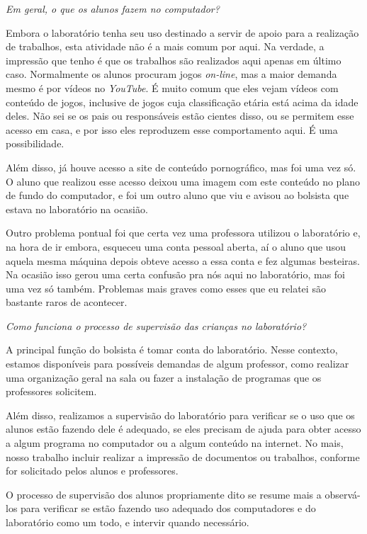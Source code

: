 \textit{Em geral, o que os alunos fazem no computador?}

Embora o laboratório tenha seu uso destinado a servir de apoio para a realização de trabalhos, esta atividade não é a mais comum por aqui. Na verdade, a impressão que tenho é que os trabalhos são realizados aqui apenas em último caso. Normalmente os alunos procuram jogos \textit{on-line}, mas a maior demanda mesmo é por vídeos no \textit{YouTube}. É muito comum que eles vejam vídeos com conteúdo de jogos, inclusive de jogos cuja classificação etária está acima da idade deles. Não sei se os pais ou responsáveis estão cientes disso, ou se permitem esse acesso em casa, e por isso eles reproduzem esse comportamento aqui. É uma possibilidade.

Além disso, já houve acesso a site de conteúdo pornográfico, mas foi uma vez só. O aluno que realizou esse acesso deixou uma imagem com este conteúdo no plano de fundo do computador, e foi um outro aluno que viu e avisou ao bolsista que estava no laboratório na ocasião.

Outro problema pontual foi que certa vez uma professora utilizou o laboratório e, na hora de ir embora, esqueceu uma conta pessoal aberta, aí o aluno que usou aquela mesma máquina depois obteve acesso a essa conta e fez algumas besteiras. Na ocasião isso gerou uma certa confusão pra nós aqui no laboratório, mas foi uma vez só também. Problemas mais graves como esses que eu relatei são bastante raros de acontecer.

\textit{Como funciona o processo de supervisão das crianças no laboratório?}

A principal função do bolsista é tomar conta do laboratório. Nesse contexto, estamos disponíveis para possíveis demandas de algum professor, como realizar uma organização geral na sala ou fazer a instalação de programas que os professores solicitem.

Além disso, realizamos a supervisão do laboratório para verificar se o uso que os alunos estão fazendo dele é adequado, se eles precisam de ajuda para obter acesso a algum programa no computador ou a algum conteúdo na internet. No mais, nosso trabalho incluir realizar a impressão de documentos ou trabalhos, conforme for solicitado pelos alunos e professores.

O processo de supervisão dos alunos propriamente dito se resume mais a observá-los para verificar se estão fazendo uso adequado dos computadores e do laboratório como um todo, e intervir quando necessário.

